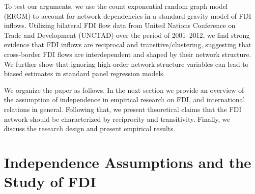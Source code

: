 \documentclass{article}
\begin{document}
To test our arguments, we use the count exponential random graph model (ERGM) to account for network dependencies in a standard gravity model of FDI inflows. Utilizing bilateral FDI flow data from United Nations Conference on Trade and Development (UNCTAD) over the period of 2001--2012, we find strong evidence that FDI inflows are reciprocal and transitive/clustering, suggesting that cross-border FDI flows are interdependent and shaped by their network structure. We further show that ignoring high-order network structure variables can lead to biased estimates in standard panel regression models.

We organize the paper as follows. In the next section we provide an overview of the assumption of independence in empirical research on FDI, and international relations in general. Following that, we present theoretical claims that the FDI network should be characterized by reciprocity and transitivity. Finally, we discuss the research design and present empirical results.








\section{Independence Assumptions and the Study of FDI}
\end{document}
